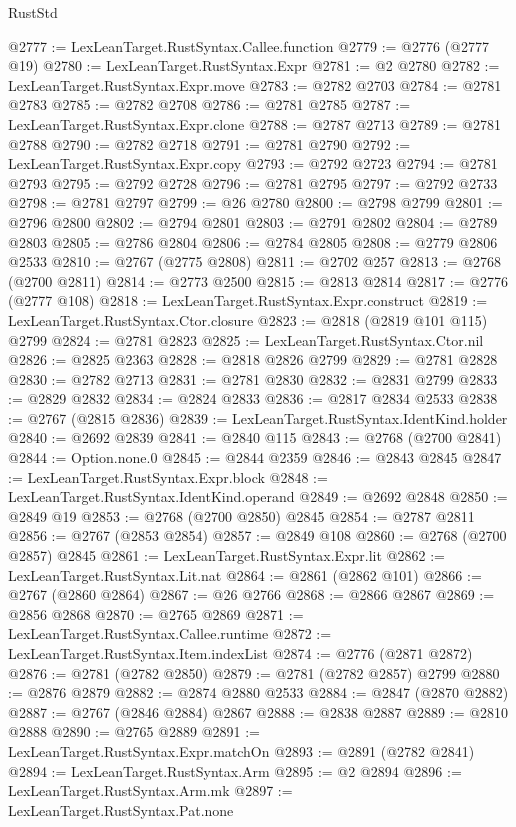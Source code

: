 \begin{lexlean}{RustStd}
\begin{coremodule}
@2777 := LexLeanTarget.RustSyntax.Callee.function
@2779 := @2776 (@2777 @19)
@2780 := LexLeanTarget.RustSyntax.Expr
@2781 := @2 @2780
@2782 := LexLeanTarget.RustSyntax.Expr.move
@2783 := @2782 @2703
@2784 := @2781 @2783
@2785 := @2782 @2708
@2786 := @2781 @2785
@2787 := LexLeanTarget.RustSyntax.Expr.clone
@2788 := @2787 @2713
@2789 := @2781 @2788
@2790 := @2782 @2718
@2791 := @2781 @2790
@2792 := LexLeanTarget.RustSyntax.Expr.copy
@2793 := @2792 @2723
@2794 := @2781 @2793
@2795 := @2792 @2728
@2796 := @2781 @2795
@2797 := @2792 @2733
@2798 := @2781 @2797
@2799 := @26 @2780
@2800 := @2798 @2799
@2801 := @2796 @2800
@2802 := @2794 @2801
@2803 := @2791 @2802
@2804 := @2789 @2803
@2805 := @2786 @2804
@2806 := @2784 @2805
@2808 := @2779 @2806 @2533
@2810 := @2767 (@2775 @2808)
@2811 := @2702 @257
@2813 := @2768 (@2700 @2811)
@2814 := @2773 @2500
@2815 := @2813 @2814
@2817 := @2776 (@2777 @108)
@2818 := LexLeanTarget.RustSyntax.Expr.construct
@2819 := LexLeanTarget.RustSyntax.Ctor.closure
@2823 := @2818 (@2819 @101 @115) @2799
@2824 := @2781 @2823
@2825 := LexLeanTarget.RustSyntax.Ctor.nil
@2826 := @2825 @2363
@2828 := @2818 @2826 @2799
@2829 := @2781 @2828
@2830 := @2782 @2713
@2831 := @2781 @2830
@2832 := @2831 @2799
@2833 := @2829 @2832
@2834 := @2824 @2833
@2836 := @2817 @2834 @2533
@2838 := @2767 (@2815 @2836)
@2839 := LexLeanTarget.RustSyntax.IdentKind.holder
@2840 := @2692 @2839
@2841 := @2840 @115
@2843 := @2768 (@2700 @2841)
@2844 := Option.none.{0}
@2845 := @2844 @2359
@2846 := @2843 @2845
@2847 := LexLeanTarget.RustSyntax.Expr.block
@2848 := LexLeanTarget.RustSyntax.IdentKind.operand
@2849 := @2692 @2848
@2850 := @2849 @19
@2853 := @2768 (@2700 @2850) @2845
@2854 := @2787 @2811
@2856 := @2767 (@2853 @2854)
@2857 := @2849 @108
@2860 := @2768 (@2700 @2857) @2845
@2861 := LexLeanTarget.RustSyntax.Expr.lit
@2862 := LexLeanTarget.RustSyntax.Lit.nat
@2864 := @2861 (@2862 @101)
@2866 := @2767 (@2860 @2864)
@2867 := @26 @2766
@2868 := @2866 @2867
@2869 := @2856 @2868
@2870 := @2765 @2869
@2871 := LexLeanTarget.RustSyntax.Callee.runtime
@2872 := LexLeanTarget.RustSyntax.Item.indexList
@2874 := @2776 (@2871 @2872)
@2876 := @2781 (@2782 @2850)
@2879 := @2781 (@2782 @2857) @2799
@2880 := @2876 @2879
@2882 := @2874 @2880 @2533
@2884 := @2847 (@2870 @2882)
@2887 := @2767 (@2846 @2884) @2867
@2888 := @2838 @2887
@2889 := @2810 @2888
@2890 := @2765 @2889
@2891 := LexLeanTarget.RustSyntax.Expr.matchOn
@2893 := @2891 (@2782 @2841)
@2894 := LexLeanTarget.RustSyntax.Arm
@2895 := @2 @2894
@2896 := LexLeanTarget.RustSyntax.Arm.mk
@2897 := LexLeanTarget.RustSyntax.Pat.none

\end{coremodule}
\end{lexlean}
